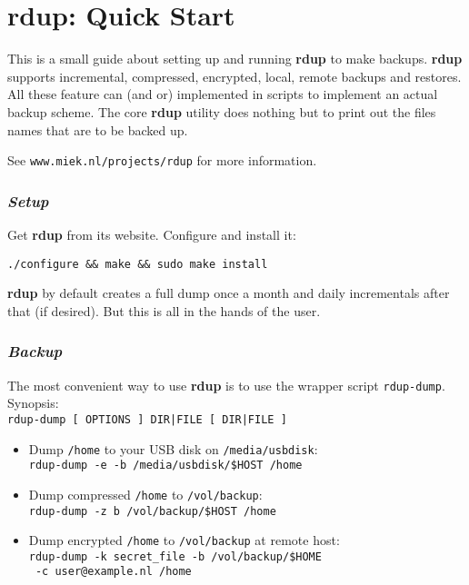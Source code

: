 \documentclass[a4paper, openany]{blocksbook}
\newcommand{\rdup}{\textbf{rdup}}
\newcommand{\cmd}[1]{\texttt{#1}}
\newcommand{\url}[1]{\texttt{#1}}
\newcommand{\path}[1]{\texttt{#1}}
\begin{document}
\chapter*{\rdup: Quick Start}
This is a small guide about setting up and running \rdup{} to make
backups. \rdup{}
supports incremental, compressed, encrypted, local, remote  backups and
restores. All these feature can (and or) implemented in scripts to
implement an actual backup scheme. The core \rdup{} utility does
nothing but to print out the files names that are to be backed up.

See \url{www.miek.nl/projects/rdup} for more information.

\subsection*{\textit{Setup}}
Get \rdup{} from its website. Configure and install it:
\begin{verbatim}
./configure && make && sudo make install
\end{verbatim}
\rdup{} by default creates a full dump once a month and 
daily incrementals after that (if desired). But this is
all in the hands of the user.

\subsection*{\textit{Backup}}
The most convenient way to use \rdup{} is to use the wrapper
script \cmd{rdup-dump}. Synopsis:\\
\cmd{rdup-dump [ OPTIONS ] DIR|FILE [ DIR|FILE ]}
\begin{itemize}
\item
Dump \path{/home} to your USB disk on \path{/media/usbdisk}:\\
\cmd{rdup-dump -e -b /media/usbdisk/\$HOST /home}
\item
Dump compressed \path{/home} to \path{/vol/backup}:\\
\cmd{rdup-dump -z b /vol/backup/\$HOST /home} 
\item
Dump encrypted \path{/home} to \path{/vol/backup} at remote
host:\\
\cmd{rdup-dump -k secret\_file -b /vol/backup/\$HOME \\\
-c user@example.nl /home}
\end{itemize}
\end{document}
